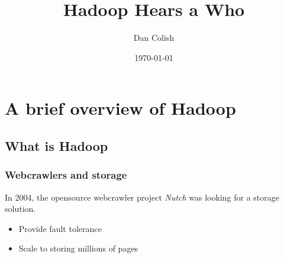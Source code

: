 \documentclass{beamer}
\title{Hadoop Hears a Who}
\author{Dan Colish}
\date{\today}
\begin{document}
\frame{\titlepage}

\section{A brief overview of Hadoop}
\subsection{What is Hadoop}

\frame
{
  \frametitle{Webcrawlers and storage}
  In 2004, the opensource webcrawler project \emph{Nutch} was looking for a
  storage solution.

  \begin{itemize}
    \item Provide fault tolerance
    \item Scale to storing millions of pages
  \end{itemize}

}


\frame
{
  \frametitle{}
  

}
\end{document}
